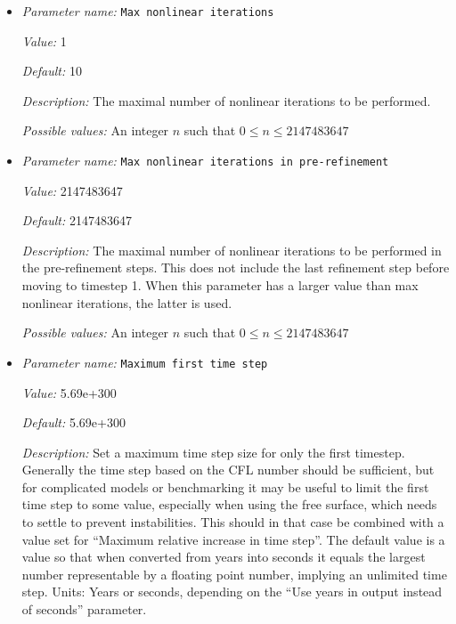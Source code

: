 \begin{itemize}
{\it Possible values:} A floating point number $v$ such that $-\text{MAX\_DOUBLE} \leq v \leq \text{MAX\_DOUBLE}$
\item {\it Parameter name:} {\tt Max nonlinear iterations}
\label{parameters:Max nonlinear iterations}
\label{parameters:Max_20nonlinear_20iterations}


{\it Value:} 1


{\it Default:} 10


{\it Description:} The maximal number of nonlinear iterations to be performed.


{\it Possible values:} An integer $n$ such that $0\leq n \leq 2147483647$
\item {\it Parameter name:} {\tt Max nonlinear iterations in pre-refinement}
\label{parameters:Max nonlinear iterations in pre_2drefinement}
\label{parameters:Max_20nonlinear_20iterations_20in_20pre_2drefinement}


{\it Value:} 2147483647


{\it Default:} 2147483647


{\it Description:} The maximal number of nonlinear iterations to be performed in the pre-refinement steps. This does not include the last refinement step before moving to timestep 1. When this parameter has a larger value than max nonlinear iterations, the latter is used.


{\it Possible values:} An integer $n$ such that $0\leq n \leq 2147483647$
\item {\it Parameter name:} {\tt Maximum first time step}
\label{parameters:Maximum first time step}
\label{parameters:Maximum_20first_20time_20step}


{\it Value:} 5.69e+300


{\it Default:} 5.69e+300


{\it Description:} Set a maximum time step size for only the first timestep. Generally the time step based on the CFL number should be sufficient, but for complicated models or benchmarking it may be useful to limit the first time step to some value, especially when using the free surface, which needs to settle to prevent instabilities. This should in that case be combined with a value set for ``Maximum relative increase in time step''. The default value is a value so that when converted from years into seconds it equals the largest number representable by a floating point number, implying an unlimited time step. Units: Years or seconds, depending on the ``Use years in output instead of seconds'' parameter.



\end{itemize}
